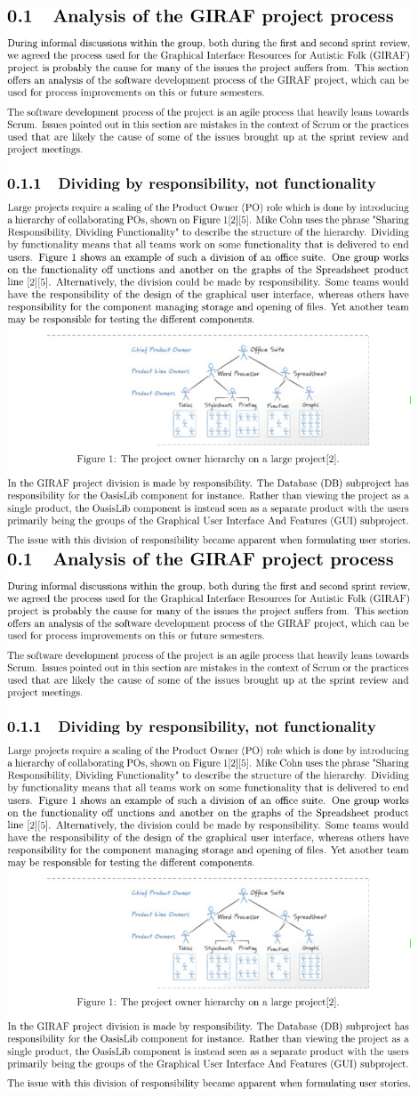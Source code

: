 \includegraphics[page=5,width=0.9\textwidth]{part_appendix/sw601f15.pdf}\newpage
\includegraphics[page=6,width=0.9\textwidth]{part_appendix/sw601f15.pdf}\newpage
